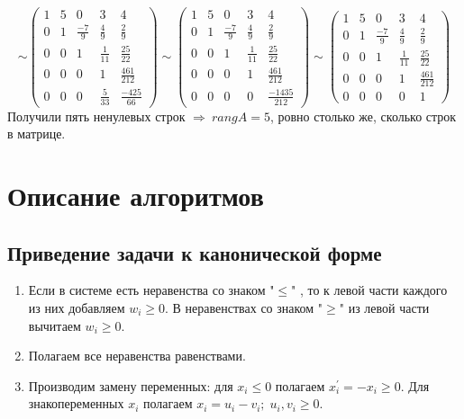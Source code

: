 \documentclass{article}
\begin{document}
\begin{equation*}
\sim
 \begin{pmatrix}
1 & 5 & 0 & 3 & 4\\
0 & 1 & \frac{-7}{9} & \frac{4}{9} & \frac{2}{9}\\
0 & 0 & 1 & \frac{1}{11} & \frac{25}{22}\\
0 & 0 & 0 & 1 & \frac{461}{212}\\
0 & 0 & 0 & \frac{5}{33} & \frac{-425}{66}
\end{pmatrix} 
\sim
\begin{pmatrix}
1 & 5 & 0 & 3 & 4\\
0 & 1 & \frac{-7}{9} & \frac{4}{9} & \frac{2}{9}\\
0 & 0 & 1 & \frac{1}{11} & \frac{25}{22}\\
0 & 0 & 0 & 1 & \frac{461}{212}\\
0 & 0 & 0 & 0 & \frac{-1435}{212}
\end{pmatrix} 
\sim
\begin{pmatrix}
1 & 5 & 0 & 3 & 4\\
0 & 1 & \frac{-7}{9} & \frac{4}{9} & \frac{2}{9}\\
0 & 0 & 1 & \frac{1}{11} & \frac{25}{22}\\
0 & 0 & 0 & 1 & \frac{461}{212}\\
0 & 0 & 0 & 0 & 1
\end{pmatrix} 
\end{equation*}
\newline
Получили пять ненулевых строк $\Rightarrow~rangA = 5$, ровно столько же, сколько строк в матрице. 

\section{Описание алгоритмов}
\subsection{Приведение задачи к канонической форме}
\label{canon}
\begin{enumerate}
    \item Если в системе есть неравенства со знаком "$\leq$"\! , то к левой части каждого из них добавляем $w_i\geq0$. В неравенствах со знаком "$\geq$"\!  из левой части вычитаем $w_i\geq0$.
    \item Полагаем все неравенства равенствами.
    \item Производим замену переменных: для $x_i\leq0$ полагаем $x^{'}_i=-x_i\geq0$. Для знакопеременных $x_i$ полагаем $x_i = u_i - v_i;\;u_i,v_i\geq0$.
\end{enumerate}
\end{document}
